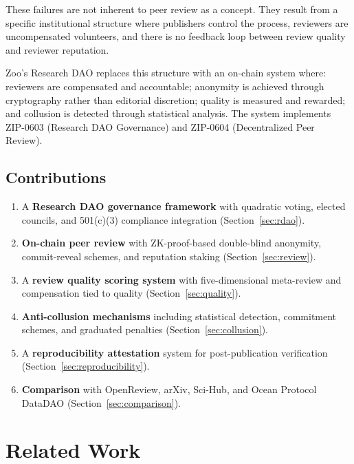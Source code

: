 \documentclass[11pt,letterpaper]{article}
\begin{document}
These failures are not inherent to peer review as a concept. They result from a specific institutional structure where publishers control the process, reviewers are uncompensated volunteers, and there is no feedback loop between review quality and reviewer reputation.

Zoo's Research DAO replaces this structure with an on-chain system where: reviewers are compensated and accountable; anonymity is achieved through cryptography rather than editorial discretion; quality is measured and rewarded; and collusion is detected through statistical analysis. The system implements ZIP-0603 (Research DAO Governance) and ZIP-0604 (Decentralized Peer Review).

\subsection{Contributions}

\begin{enumerate}
    \item A \textbf{Research DAO governance framework} with quadratic voting, elected councils, and 501(c)(3) compliance integration (Section~\ref{sec:rdao}).
    \item \textbf{On-chain peer review} with ZK-proof-based double-blind anonymity, commit-reveal schemes, and reputation staking (Section~\ref{sec:review}).
    \item A \textbf{review quality scoring system} with five-dimensional meta-review and compensation tied to quality (Section~\ref{sec:quality}).
    \item \textbf{Anti-collusion mechanisms} including statistical detection, commitment schemes, and graduated penalties (Section~\ref{sec:collusion}).
    \item A \textbf{reproducibility attestation} system for post-publication verification (Section~\ref{sec:reproducibility}).
    \item \textbf{Comparison} with OpenReview, arXiv, Sci-Hub, and Ocean Protocol DataDAO (Section~\ref{sec:comparison}).
\end{enumerate}

\section{Related Work}
\label{sec:related}
\end{document}

